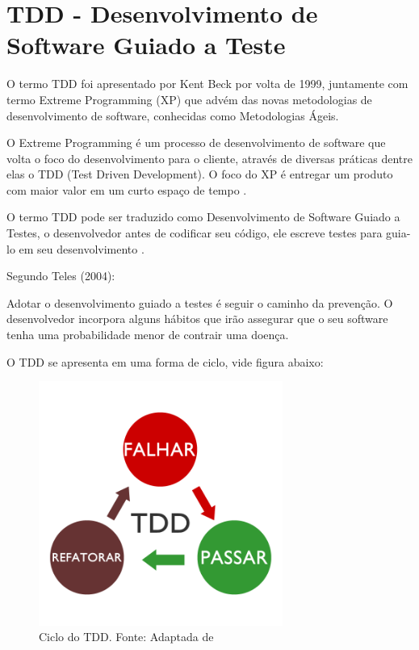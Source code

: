 \documentclass[pnumabnt,normaltoc,espacoumemeio,capchap]{abnt}
\begin{document}
\section{TDD - Desenvolvimento de Software Guiado a Teste}
\par O termo TDD foi apresentado por Kent Beck por volta de 1999, juntamente com termo Extreme Programming (XP) que advém das novas metodologias de desenvolvimento de software, conhecidas como Metodologias Ágeis.
\par O Extreme Programming é um processo de desenvolvimento de software que volta o foco do desenvolvimento para o cliente, através de diversas práticas dentre elas o TDD (Test Driven Development). O foco do XP é entregar um produto com maior valor em um curto espaço de tempo \cite{TL04}.
\par O termo TDD pode ser traduzido como Desenvolvimento de Software Guiado a Testes, o desenvolvedor antes de codificar seu código, ele escreve testes para guia-lo em seu desenvolvimento \cite{TL04}.
\par Segundo Teles (2004): 
\begin{citacao}
	Adotar o desenvolvimento guiado a testes é seguir o caminho da prevenção. O desenvolvedor incorpora alguns hábitos que irão assegurar que o seu software tenha uma probabilidade menor de contrair uma doença.
\end{citacao}
\par O TDD se apresenta em uma forma de ciclo, vide figura abaixo:
\begin{figure}[htbp]
	\centering
	\caption{Ciclo do TDD\label{fig:f3}. Fonte: Adaptada de }
	\includegraphics[width=8cm,scale=1]{images/f3.png}
\end{figure}
\end{document}
